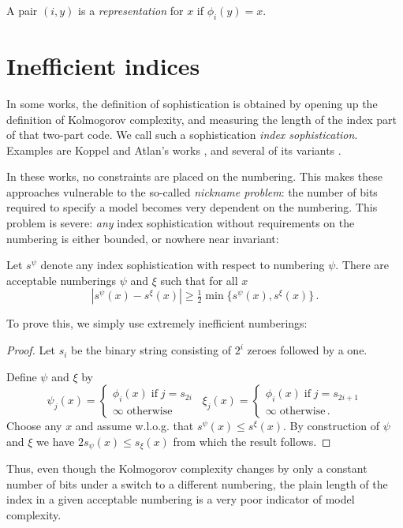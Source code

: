 \documentclass{style/llncs}
\newcommand{\p}{\,\text{.}}
\begin{document}
A pair $(i,y)$ is a \emph{representation} for $x$ if $\phi_i(y)=x$.

\section{Inefficient indices}
\label{section:indices}
In some works, the definition of sophistication is obtained by opening up the definition of Kolmogorov complexity, and measuring the length of the index part of that two-part code. We call such a sophistication \emph{index sophistication}. Examples are Koppel and Atlan's works \cite{koppelSoph1988,koppel1991almost},  and several of its variants \cite{antunes2009sophistication,antunes2013sophistication}. 

In these works, no constraints are placed on the numbering. This makes these approaches vulnerable to the so-called \emph{nickname problem}: the number of bits required to specify a model becomes very dependent on the numbering. This problem is severe: \emph{any} index sophistication without requirements on the numbering is either bounded, or nowhere near invariant:

\begin{lemma}
Let $s^\psi$ denote any index sophistication with respect to numbering $\psi$.
There are acceptable numberings $\psi$ and $\xi$ such that for all $x$
\[|s^\psi(x) - s^\xi(x)|\geq \tfrac{1}{2}\min\{s^\psi(x),s^\xi(x)\}\p\]
\end{lemma}

To prove this, we simply use extremely inefficient numberings:

\begin{proof}
Let $s_i$ be the binary string consisting of $2^{i}$ zeroes followed by a one.

Define $\psi$ and $\xi$ by
\[
\psi_j(x) = \begin{cases}
	\phi_i(x) \;\text{if}\; j = s_{2i}\\
	\infty\;\text{otherwise}
\end{cases}\,\,\,
\xi_j(x) = 
\begin{cases}
	\phi_i(x) \;\text{if}\; j = s_{2i+1} \\
	\infty \;\text{otherwise}\p
\end{cases}
\]
Choose any $x$ and assume w.l.o.g. that $s^\psi(x)\le s^\xi(x)$. By construction of $\psi$ and $\xi$ we have $2s_\psi(x)  \leq s_\xi(x)$ from which the result follows.
\end{proof}
Thus, even though the Kolmogorov complexity changes by only a constant number of bits under a switch to a different numbering, the plain length of the index in a given acceptable numbering is a very poor indicator of model complexity.
\end{document}
